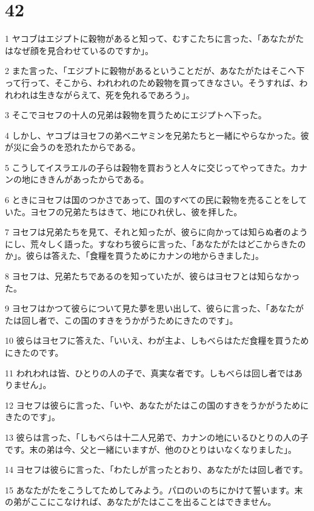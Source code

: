 \chapter{42}

\par 1 ヤコブはエジプトに穀物があると知って、むすこたちに言った、「あなたがたはなぜ顔を見合わせているのですか」。
\par 2 また言った、「エジプトに穀物があるということだが、あなたがたはそこへ下って行って、そこから、われわれのため穀物を買ってきなさい。そうすれば、われわれは生きながらえて、死を免れるであろう」。
\par 3 そこでヨセフの十人の兄弟は穀物を買うためにエジプトへ下った。
\par 4 しかし、ヤコブはヨセフの弟ベニヤミンを兄弟たちと一緒にやらなかった。彼が災に会うのを恐れたからである。
\par 5 こうしてイスラエルの子らは穀物を買おうと人々に交じってやってきた。カナンの地にききんがあったからである。
\par 6 ときにヨセフは国のつかさであって、国のすべての民に穀物を売ることをしていた。ヨセフの兄弟たちはきて、地にひれ伏し、彼を拝した。
\par 7 ヨセフは兄弟たちを見て、それと知ったが、彼らに向かっては知らぬ者のようにし、荒々しく語った。すなわち彼らに言った、「あなたがたはどこからきたのか」。彼らは答えた、「食糧を買うためにカナンの地からきました」。
\par 8 ヨセフは、兄弟たちであるのを知っていたが、彼らはヨセフとは知らなかった。
\par 9 ヨセフはかつて彼らについて見た夢を思い出して、彼らに言った、「あなたがたは回し者で、この国のすきをうかがうためにきたのです」。
\par 10 彼らはヨセフに答えた、「いいえ、わが主よ、しもべらはただ食糧を買うためにきたのです。
\par 11 われわれは皆、ひとりの人の子で、真実な者です。しもべらは回し者ではありません」。
\par 12 ヨセフは彼らに言った、「いや、あなたがたはこの国のすきをうかがうためにきたのです」。
\par 13 彼らは言った、「しもべらは十二人兄弟で、カナンの地にいるひとりの人の子です。末の弟は今、父と一緒にいますが、他のひとりはいなくなりました」。
\par 14 ヨセフは彼らに言った、「わたしが言ったとおり、あなたがたは回し者です。
\par 15 あなたがたをこうしてためしてみよう。パロのいのちにかけて誓います。末の弟がここにこなければ、あなたがたはここを出ることはできません。
